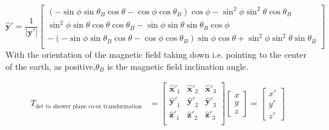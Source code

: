 \documentclass[11pt]{article}
\begin{document}
\begin{equation}
   \mathbf{\hat{y}'}= \frac{1}{\mathbf{|{y'}|}}\left[
    \begin{array}{c}
  (-\sin\phi\sin\theta_B\cos\theta - \cos\phi\cos\theta_B)\cos\phi - \sin^2\phi\sin^2\theta\cos\theta_B\\ 

\sin^2\phi\sin\theta\cos\theta\cos\theta_B - \sin\phi\sin\theta\sin\theta_B\cos\phi\\


-(-\sin\phi\sin\theta_B\cos\theta - \cos\phi\cos\theta_B)\sin\phi\cos\theta + \sin^2\phi\sin^2\theta\sin\theta_B\\
\end{array} 
\right]
\end{equation}
With the orientation of the magnetic field taking  down i.e. pointing to the center of the earth, as positive,$\theta_B$ is the magnetic field  inclination angle. 


\begin{align*}
T_{\mbox{det  to shower plane co-or transformation}} &= \left[\begin{array}{ccc}
  \mathbf{\hat{x}'} _{1} & \mathbf{\hat{x}'} _{2} & \mathbf{\hat{x}'} _{3} \\
  \mathbf{\hat{y}'} _{1} & \mathbf{\hat{y}'} _{2} & \mathbf{\hat{y}'} _{3}\\
  \mathbf{\hat{z}'} _{1} &\mathbf{\hat{z}'} _{2} & \mathbf{\hat{z}'} _{3} \\
\end{array}\right]
\begin{bmatrix}
  x  \\
  y  \\
  z
\end{bmatrix} 
= \begin{bmatrix}
  x'  \\
  y'  \\
  z'
\end{bmatrix}
\end{align*}
\end{document}

